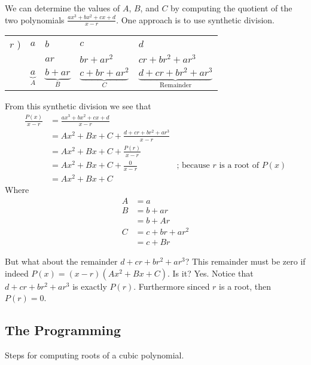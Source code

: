 We can determine the values of $A$, $B$, and $C$ by computing the quotient of
the two polynomials $\frac{a x^3 + b x^2 + c x + d}{x-r}$. One approach is to use synthetic division.

\medskip

\begin{tabular}{lllll}
  \hline
  $r$ ) & $a$ & $b$       & $c$              & $d$\\
        &     & $a r$     & $b r+a r^2$      & $c r + b r^2 + a r^3$\\
  \hline
        & $\underbrace{a}_{A}$\quad\quad & $\underbrace{b + a r}_{B}$ \quad\quad& $\underbrace{c + b r + a r^2}_{C}$\quad\quad & $\underbrace{d + c r + b r^2 + a r^3}_{\text{Remainder}}$
\end{tabular}

From this synthetic division we see that 
\begin{align*}
  \frac{P(x)}{x-r} &=   \frac{a x^3 + b x^2 + c x + d}{x-r} \\
  &= A x^2 + B x + C + \frac{d + c r + b r^2 + a r^3}{x-r}\\
  &= A x^2 + B x + C + \frac{P(r)}{x-r}\\
  &= A x^2 + B x + C + \frac{0}{x-r} & \text{; because $r$ is a root of $P(x)$}\\
  &= A x^2 + B x + C
\end{align*}
Where
\begin{align}
 A &= a\label{eq.6.A}\\
  B &= b + a r\nonumber\\
   &= b + A r\label{eq.6.B}\\
  C &= c + b r + a r^2\nonumber\\
  &= c + B r\label{eq.6.C}
\end{align}

But what about the remainder $d + c r + b r^2 + a r^3$? This remainder must be zero if indeed 
$P(x) = (x-r)(A x^2 + B x + C)$.  Is it?  Yes.
Notice that $d + c r + b r^2 + a r^3$ is exactly $P(r)$.  Furthermore sinced $r$ is a root,
then $P(r)=0$.
\subsection{The Programming}

Steps for computing roots of a cubic polynomial.

